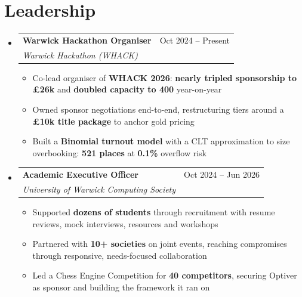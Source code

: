 \documentclass[letterpaper,10pt]{article}
\makeatletter
\newcommand{\resumeItem}[1]{
  \item\small{
    {#1 \vspace{-2pt}}
  }
}
\newcommand{\resumeSubheading}[4]{
  \vspace{-2pt}\item
    \begin{tabular*}{0.97\textwidth}[t]{l@{\extracolsep{\fill}}r}
      \textbf{#1} & #2 \\
      \textit{\small#3} & \textit{\small #4} \\
    \end{tabular*}\vspace{-7pt}
}
\newcommand{\resumeSubHeadingListStart}{\begin{itemize}[leftmargin=0.15in, label={}]}
\newcommand{\resumeSubHeadingListEnd}{\end{itemize}}
\newcommand{\resumeItemListStart}{\begin{itemize}}
\newcommand{\resumeItemListEnd}{\end{itemize}\vspace{-5pt}}
\makeatother
\begin{document}
\section{Leadership}
    \resumeSubHeadingListStart
      \resumeSubheading
          {\textbf{Warwick Hackathon Organiser}}{Oct 2024 -- Present}{Warwick Hackathon (WHACK)}{}
          \resumeItemListStart
            \resumeItem{Co-lead organiser of \textbf{WHACK 2026}: \textbf{nearly tripled sponsorship to £26k} and \textbf{doubled capacity to 400} year-on-year}
            \resumeItem{Owned sponsor negotiations end-to-end, restructuring tiers around a \textbf{£10k title package} to anchor gold pricing}
            \resumeItem{Built a \textbf{Binomial turnout model} with a CLT approximation to size overbooking: \textbf{521 places} at \textbf{0.1\%} overflow risk}
          \resumeItemListEnd
      \resumeSubheading
          {\textbf{Academic Executive Officer}}{Oct 2024 -- Jun 2026}{University of Warwick Computing Society}{}
          \resumeItemListStart
            \resumeItem{Supported \textbf{dozens of students} through recruitment with resume reviews, mock interviews, resources and workshops}
            \resumeItem{Partnered with \textbf{10+ societies} on joint events, reaching compromises through responsive, needs-focused collaboration}
            \resumeItem{Led a Chess Engine Competition for \textbf{40 competitors}, securing Optiver as sponsor and building the framework it ran on}
          \resumeItemListEnd
    \resumeSubHeadingListEnd


\end{document}
